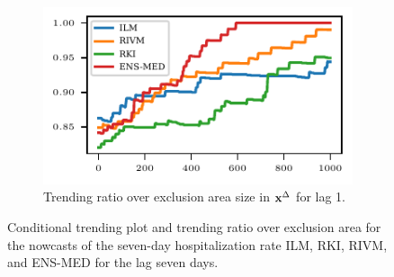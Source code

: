 \begin{figure}
    \begin{subfigure}[t]{.48\textwidth}
    \includegraphics{plots/covid_nowcast/40_acc_eps_lag_14}
    \caption{Trending ratio over exclusion area size in $\mathbf{x}^{\Delta}$ for lag 1.}\label{fig:app-covid-trending-ratio-14}
    \end{subfigure}
    \caption{Conditional trending plot and trending ratio over exclusion area for the nowcasts of the seven-day hospitalization rate ILM, RKI, RIVM, and ENS-MED for the lag seven days.}
    \label{fig:app-covid-cond-prob-trending-ratio-1-14}
\end{figure}